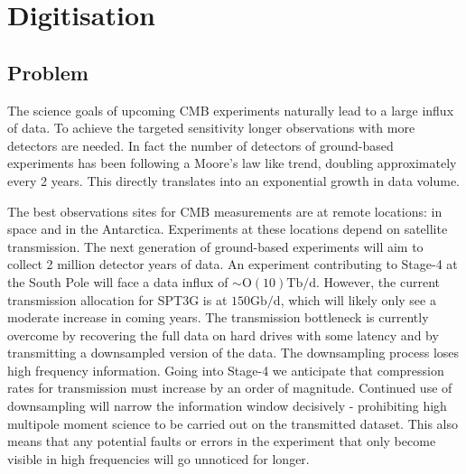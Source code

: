 \documentclass[apj]{emulateapj}
\begin{document}





\section{Digitisation}
\label{sec:dig}

\subsection{Problem}
\label{subsec:problem}


The science goals of upcoming CMB experiments naturally lead to a large influx of data. To achieve the targeted sensitivity longer observations with more detectors are needed. In fact the number of detectors of ground-based experiments has been following a Moore's law like trend, doubling approximately every 2 years. This directly translates into an exponential growth in data volume.

The best observations sites for CMB measurements are at remote locations: in space and in the Antarctica. Experiments at these locations depend on satellite transmission. The next generation of ground-based experiments will aim to collect 2 million detector years of data. An experiment contributing to Stage-4 at the South Pole will face a data influx of $\sim \mathrm{O}(10)\mathrm{Tb/d}$. However, the current transmission allocation for SPT3G is at $150\mathrm{Gb/d}$, which will likely only see a moderate increase in coming years. The transmission bottleneck is currently overcome by recovering the full data on hard drives with some latency and by transmitting a downsampled version of the data. The downsampling process loses high frequency information. Going into Stage-4 we anticipate that compression rates for transmission must increase by an order of magnitude. Continued use of downsampling will narrow the information window decisively - prohibiting high multipole moment science to be carried out on the transmitted dataset. This also means that any potential faults or errors in the experiment that only become visible in high frequencies will go unnoticed for longer.
\end{document}
